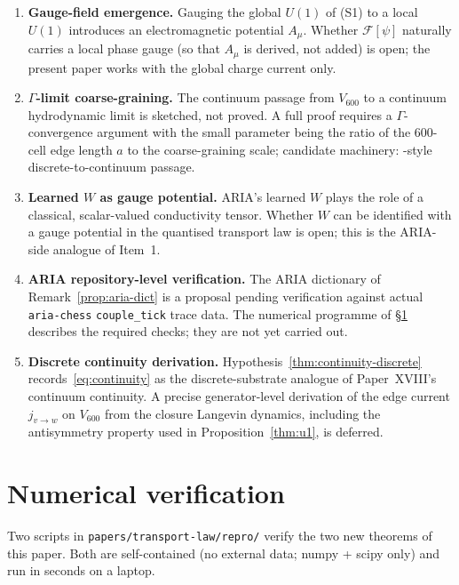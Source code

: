 \documentclass[11pt]{article}
\theoremstyle{definition}
\newcommand{\Fcal}{\mathcal{F}}
\begin{document}
\begin{enumerate}
    \item \textbf{Gauge-field emergence.} Gauging the global $U(1)$ of (S1) to a local $U(1)$ introduces an electromagnetic potential $A_\mu$. Whether $\Fcal[\psi]$ naturally carries a local phase gauge (so that $A_\mu$ is derived, not added) is open; the present paper works with the global charge current only.
    \item \textbf{$\Gamma$-limit coarse-graining.} The continuum passage from $V_{600}$ to a continuum hydrodynamic limit is sketched, not proved. A full proof requires a $\Gamma$-convergence argument with the small parameter being the ratio of the $600$-cell edge length $a$ to the coarse-graining scale; candidate machinery: \citep{Alicandro2006}-style discrete-to-continuum passage.
    \item \textbf{Learned $W$ as gauge potential.} ARIA's learned $W$ plays the role of a classical, scalar-valued conductivity tensor. Whether $W$ can be identified with a gauge potential in the quantised transport law is open; this is the ARIA-side analogue of Item~1.
    \item \textbf{ARIA repository-level verification.} The ARIA dictionary of Remark~\ref{prop:aria-dict} is a proposal pending verification against actual \texttt{aria-chess} \texttt{couple\_tick} trace data. The numerical programme of \S\ref{sec:numerical} describes the required checks; they are not yet carried out.
    \item \textbf{Discrete continuity derivation.} Hypothesis~\ref{thm:continuity-discrete} records~\eqref{eq:continuity} as the discrete-substrate analogue of Paper~XVIII's continuum continuity. A precise generator-level derivation of the edge current $j_{v\to w}$ on $V_{600}$ from the closure Langevin dynamics, including the antisymmetry property used in Proposition~\ref{thm:u1}, is deferred.
\end{enumerate}

\section{Numerical verification}\label{sec:numerical}

Two scripts in \texttt{papers/transport-law/repro/} verify the two new theorems of this paper. Both are self-contained (no external data; numpy + scipy only) and run in seconds on a laptop.
\end{document}
